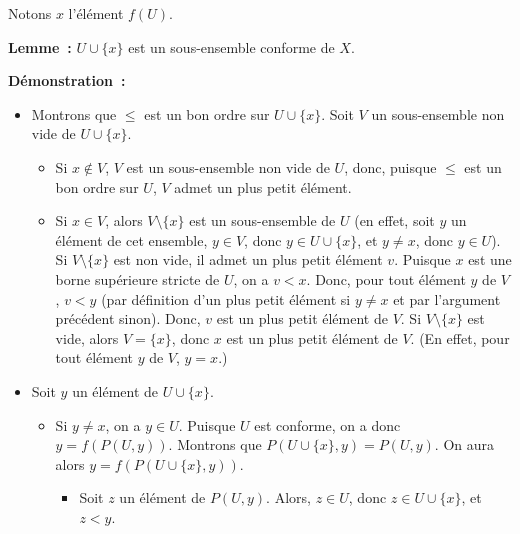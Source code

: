     \done

\medskip

Notons $x$ l'élément $f(U)$. 

\medskip

\noindent\textbf{Lemme :} $U \cup \lbrace x \rbrace$ est un sous-ensemble conforme de $X$.

\medskip

\noindent\textbf{Démonstration :} 
\begin{itemize}
    \item Montrons que $\leq$ est un bon ordre sur $U \cup \lbrace x \rbrace$.
        Soit $V$ un sous-ensemble non vide de $U \cup \lbrace x \rbrace$.
        \begin{itemize}[nosep]
            \item Si $x \notin V$, $V$ est un sous-ensemble non vide de $U$, donc, puisque $\leq$ est un bon ordre sur $U$, $V$ admet un plus petit élément.
            \item Si $x \in V$, alors $V \setminus \lbrace x \rbrace$ est un sous-ensemble de $U$ (en effet, soit $y$ un élément de cet ensemble, $y \in V$, donc $y \in U \cup \lbrace x \rbrace$, et $y \neq x$, donc $y \in U$).
                Si $V \setminus \lbrace x \rbrace$ est non vide, il admet un plus petit élément $v$. 
                Puisque $x$ est une borne supérieure stricte de $U$, on a $v < x$. 
                Donc, pour tout élément $y$ de $V$, $v < y$ (par définition d'un plus petit élément si $y \neq x$ et par l'argument précédent sinon). 
                Donc, $v$ est un plus petit élément de $V$.
                Si $V \setminus \lbrace x \rbrace$ est vide, alors $V = \lbrace x \rbrace$, donc $x$ est un plus petit élément de $V$.
                (En effet, pour tout élément $y$ de $V$, $y = x$.)
        \end{itemize}
    \item Soit $y$ un élément de $U \cup \lbrace x \rbrace$.
        \begin{itemize}[nosep]
            \item Si $y \neq x$, on a $y \in U$. 
                Puisque $U$ est conforme, on a donc $y = f(P(U, y))$. 
                Montrons que $P(U \cup \lbrace x \rbrace, y) = P(U, y)$.
                On aura alors $y = f(P(U \cup \lbrace x \rbrace, y))$.
                \begin{itemize}[nosep]
                    \item Soit $z$ un élément de $P(U, y)$.
                        Alors, $z \in U$, donc $z \in U \cup \lbrace x \rbrace$, et $z < y$.

\end{itemize}
\end{itemize}
\end{itemize}

